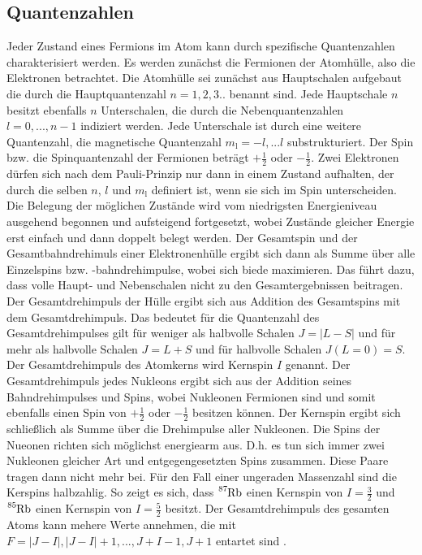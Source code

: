 \subsection{Quantenzahlen}

Jeder Zustand eines Fermions im Atom kann durch spezifische Quantenzahlen 
charakterisiert werden. Es werden zunächst die Fermionen der Atomhülle, also die 
Elektronen betrachtet. Die Atomhülle sei zunächst aus Hauptschalen aufgebaut die 
durch die Hauptquantenzahl $n = 1,2,3..$ benannt sind. Jede Hauptschale $n$ besitzt 
ebenfalls $n$  Unterschalen, die durch die Nebenquantenzahlen $l = 0,...,n-1$ 
indiziert werden. Jede Unterschale ist durch eine weitere Quantenzahl, 
die magnetische Quantenzahl $m_{\text{l}}=-l,...l$ substrukturiert. 
Der Spin bzw. die Spinquantenzahl der Fermionen beträgt $+\frac{1}{2}$ oder 
$-\frac{1}{2}$.
Zwei Elektronen dürfen sich nach dem Pauli-Prinzip nur dann in einem Zustand aufhalten, 
der durch die selben $n$, $l$ und $m_{\text{l}}$ definiert ist, wenn sie sich im 
Spin unterscheiden. Die Belegung der möglichen Zustände wird vom niedrigsten Energieniveau 
ausgehend begonnen und aufsteigend fortgesetzt, wobei Zustände gleicher Energie erst einfach 
und dann doppelt belegt werden.
Der Gesamtspin und der Gesamtbahndrehimuls einer Elektronenhülle ergibt sich dann 
als Summe über alle Einzelspins bzw. -bahndrehimpulse, wobei sich biede maximieren.
Das führt dazu, dass volle Haupt- und Nebenschalen nicht zu den Gesamtergebnissen 
beitragen. Der Gesamtdrehimpuls der Hülle ergibt sich aus Addition des Gesamtspins mit 
dem Gesamtdrehimpuls. Das bedeutet für die Quantenzahl des Gesamtdrehimpulses gilt 
für weniger als halbvolle Schalen $J = |L-S|$ und für mehr als halbvolle Schalen 
$J = L+S$ und für halbvolle Schalen $J(L=0) = S$. 
Der Gesamtdrehimpuls des Atomkerns wird Kernspin $I$ genannt. Der Gesamtdrehimpuls 
jedes Nukleons ergibt sich aus der Addition seines Bahndrehimpulses und Spins, 
wobei Nukleonen Fermionen sind und somit ebenfalls einen Spin von  $+\frac{1}{2}$ oder 
$-\frac{1}{2}$ besitzen können. Der Kernspin ergibt sich schließlich als Summe über die 
Drehimpulse aller Nukleonen. Die Spins der Nueonen richten sich möglichst energiearm 
aus. D.h. es tun sich immer zwei Nukleonen gleicher Art und entgegengesetzten Spins 
zusammen. Diese Paare tragen dann nicht mehr bei. Für den Fall einer ungeraden Massenzahl 
sind die Kerspins halbzahlig. So zeigt es sich, dass
$\ce{^87Rb}$ einen Kernspin von $I = \frac{3}{2}$ und  $\ce{^85Rb}$ einen Kernspin von 
$I = \frac{5}{2}$ besitzt.
Der Gesamtdrehimpuls des gesamten Atoms kann mehere Werte annehmen, die mit
$F = |J-I|, |J-I|+1,..., J+I -1, J+1$ entartet sind \cite{1}. 

